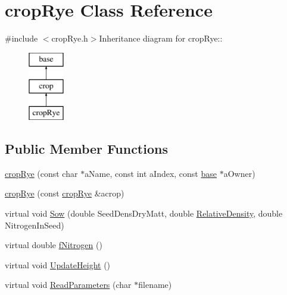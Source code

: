 \hypertarget{classcrop_rye}{
\section{cropRye Class Reference}
\label{classcrop_rye}
}


{\ttfamily \#include $<$cropRye.h$>$}Inheritance diagram for cropRye::\begin{figure}[H]
\begin{center}
\leavevmode
\includegraphics[height=3cm]{classcrop_rye}
\end{center}
\end{figure}
\subsection*{Public Member Functions}
\begin{DoxyCompactItemize}
\item 
\hyperlink{classcrop_rye_a6f018fce527da6ab7f2100679d6e3077}{cropRye} (const char $\ast$aName, const int aIndex, const \hyperlink{classbase}{base} $\ast$aOwner)
\item 
\hyperlink{classcrop_rye_a236684be4b8b349bf2a1e5917ed6660b}{cropRye} (const \hyperlink{classcrop_rye}{cropRye} \&acrop)
\item 
virtual void \hyperlink{classcrop_rye_a0e583eca63fb8a2f609763d1a319d891}{Sow} (double SeedDensDryMatt, double \hyperlink{classcrop_aa4666fdd11920e05003bfeefc5518ddf}{RelativeDensity}, double NitrogenInSeed)
\item 
virtual double \hyperlink{classcrop_rye_a2781d1b924cb3e3f9fba021a5052c629}{fNitrogen} ()
\item 
virtual void \hyperlink{classcrop_rye_ad2996d19a34c3a800f1f356b522b4904}{UpdateHeight} ()
\item 
virtual void \hyperlink{classcrop_rye_aed534e2eb483b8bdd49bb3634492050c}{ReadParameters} (char $\ast$filename)
\end{DoxyCompactItemize}
